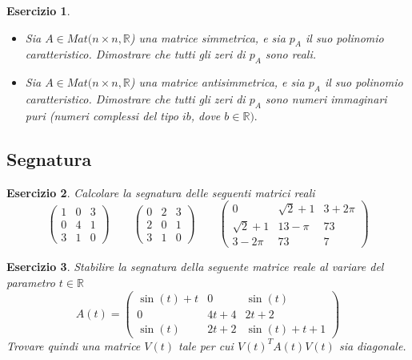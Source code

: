\documentclass{article}
\newtheorem{es}{Esercizio}
\begin{document}
{\begin{es}
    \begin{itemize}
        \item Sia $A\in Mat(n\times n, \mathbb{R}$) una matrice simmetrica, e sia $p_A$ il suo polinomio caratteristico. Dimostrare che tutti gli zeri di $p_A$ sono reali.
        \item Sia $A\in Mat(n\times n, \mathbb{R}$) una matrice antisimmetrica, e sia $p_A$ il suo polinomio caratteristico. Dimostrare che tutti gli zeri di $p_A$ sono numeri immaginari puri (numeri complessi del tipo $ib$, dove $b\in \mathbb{R}).$
    \end{itemize}
\end{es}



\subsection{Segnatura}



\begin{es}
    Calcolare la segnatura delle seguenti matrici reali
    $$\begin{pmatrix}
        1 & 0 & 3\\
        0 & 4 & 1\\
        3 & 1 & 0
    \end{pmatrix}\qquad \begin{pmatrix}
        0 & 2 & 3\\
        2 & 0 & 1\\
        3 & 1 & 0
    \end{pmatrix}\qquad \begin{pmatrix}
        0 & \sqrt{2}+1 & 3+2\pi\\
        \sqrt{2}+1 & 13-\pi & 73\\
        3-2\pi & 73 & 7
    \end{pmatrix}$$
\end{es}


\begin{es}
    Stabilire la segnatura della seguente matrice reale al variare del parametro $t\in \mathbb{R}$
    $$A(t)=\begin{pmatrix}
        \sin(t)+t & 0 & \sin(t)\\
        0 & 4t+4 & 2t+2\\
        \sin(t) & 2t+2 & \sin(t)+t+1
    \end{pmatrix}$$
    Trovare quindi una matrice $V(t)$ tale per cui $V(t)^T A(t) V(t)$ sia diagonale.
\end{es}



}
\end{document}
